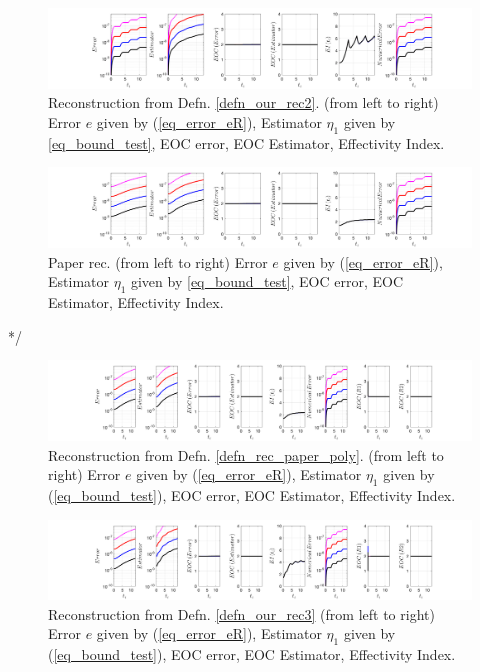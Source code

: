 \documentclass[12pt,a4paper]{article}
\numberwithin{equation}{section}
\theoremstyle{definition}
\begin{document}
\begin{figure}[H]
	\hspace{-3cm}
	\includegraphics[scale=0.55]{fig_LeapFrogplots_1x5_sin_IC_harmonic_order_2_u0_v10_rec2}	
	\caption{Reconstruction from Defn. \ref{defn_our_rec2}. (from left to right) Error $e$ given by (\ref{eq_error_eR}), Estimator $\eta_1$ given by \ref{eq_bound_test}, EOC error, EOC Estimator, Effectivity Index.}
	\label{fig_all_in_one_our_rec_2_u0_v10}
\end{figure}

\begin{figure}[H]
	\hspace{-3cm}
	\includegraphics[scale=0.55]{fig_LeapFrogplots_1x5_sin_IC_harmonic_u0_v10_paperrec}	
	\caption{Paper rec. (from left to right) Error $e$ given by (\ref{eq_error_eR}), Estimator $\eta_1$ given by \ref{eq_bound_test}, EOC error, EOC Estimator, Effectivity Index.}
	\label{fig_all_in_one_paperrec_u0_v10}
\end{figure}
*/
\begin{figure}[H]
	\hspace{-3cm}
	\includegraphics[scale=0.55]{fig_LeapFrogplots_1x5_sin_IC_harmonic_u0_v10_paperrec_poly_our_res}	
	\caption{Reconstruction from Defn. \ref{defn_rec_paper_poly}. (from left to right) Error $e$ given by (\ref{eq_error_eR}), Estimator $\eta_1$ given by (\ref{eq_bound_test}), EOC error, EOC Estimator, Effectivity Index.}
	\label{fig_all_in_one_paperrec_poly_u0_v10}
\end{figure}

\begin{figure}[H]
	\hspace{-3cm}
	\includegraphics[scale=0.55]{fig_LeapFrogplots_1x5_sin_IC_harmonic_u0_v10_paperrec_poly_tristan}	
	\caption{Reconstruction from Defn. \ref{defn_our_rec3} (from left to right) Error $e$ given by (\ref{eq_error_eR}), Estimator $\eta_1$ given by (\ref{eq_bound_test}), EOC error, EOC Estimator, Effectivity Index.}
	\label{fig_all_in_one_paperrec_poly_tristan_u0_v10}
\end{figure}
\end{document}
